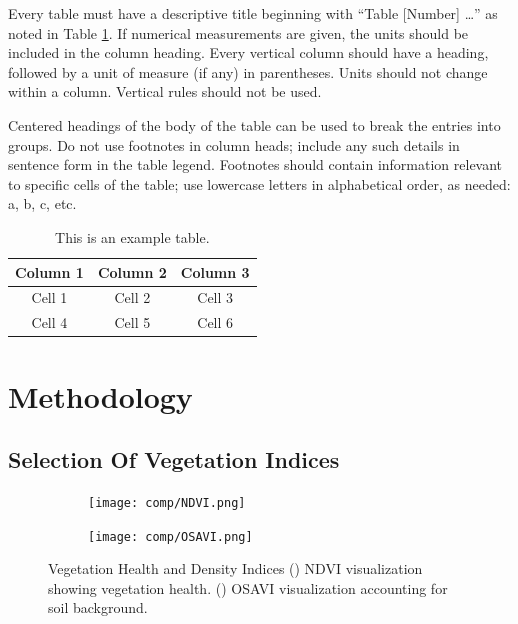 \documentclass{article}
\begin{document}
Every table must have a descriptive title beginning with ``Table [Number] …'' as noted in Table \ref{tab:1}. If numerical measurements are given, the units should be included in the column heading. Every vertical column should have a heading, followed by a unit of measure (if any) in parentheses. Units should not change within a column. Vertical rules should not be used. 

Centered headings of the body of the table can be used to break the entries into groups. Do not use footnotes in column heads; include any such details in sentence form in the table legend. Footnotes should contain information relevant to specific cells of the table; use lowercase letters in alphabetical order, as needed: a, b, c, etc. 

\begin{table}[b]
    \caption{This is an example table.}    
    \centering
    \begin{tabular}{ccc}
            \hline
            Column 1 & Column 2 & Column 3 \\  
            \hline
            Cell 1 & Cell 2 & Cell 3\\ 
            Cell 4 & Cell 5 & Cell 6 \\
            \hline
            \end{tabular}

    \label{tab:1}
\end{table}
\FloatBarrier

\section{Methodology}
\subsection*{Selection Of Vegetation Indices }
\begin{figure}[h]
    \centering
    \begin{subfigure}{0.4\textwidth}
        \texttt{[image: comp/NDVI.png]}
        \caption{\label{fig:2a}}
    \end{subfigure}
    \begin{subfigure}{0.4\textwidth}
        \texttt{[image: comp/OSAVI.png]}
        \caption{\label{fig:2b}}
    \end{subfigure}
    \caption{Vegetation Health and Density Indices     () NDVI visualization showing vegetation health. () OSAVI visualization accounting for soil background.}
    \label{fig:2}
\end{figure}
\end{document}
